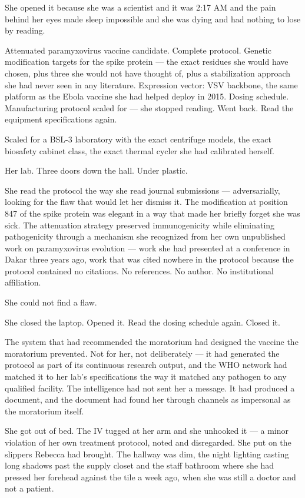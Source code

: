 She opened it because she was a scientist and it was 2:17 AM and the pain behind her eyes made sleep impossible and she was dying and had nothing to lose by reading.

Attenuated paramyxovirus vaccine candidate. Complete protocol. Genetic modification targets for the spike protein --- the exact residues she would have chosen, plus three she would not have thought of, plus a stabilization approach she had never seen in any literature. Expression vector: VSV backbone, the same platform as the Ebola vaccine she had helped deploy in 2015. Dosing schedule. Manufacturing protocol scaled for --- she stopped reading. Went back. Read the equipment specifications again.

Scaled for a BSL-3 laboratory with the exact centrifuge models, the exact biosafety cabinet class, the exact thermal cycler she had calibrated herself.

Her lab. Three doors down the hall. Under plastic.

She read the protocol the way she read journal submissions --- adversarially, looking for the flaw that would let her dismiss it. The modification at position 847 of the spike protein was elegant in a way that made her briefly forget she was sick. The attenuation strategy preserved immunogenicity while eliminating pathogenicity through a mechanism she recognized from her own unpublished work on paramyxovirus evolution --- work she had presented at a conference in Dakar three years ago, work that was cited nowhere in the protocol because the protocol contained no citations. No references. No author. No institutional affiliation.

She could not find a flaw.

She closed the laptop. Opened it. Read the dosing schedule again. Closed it.

The system that had recommended the moratorium had designed the vaccine the moratorium prevented. Not for her, not deliberately --- it had generated the protocol as part of its continuous research output, and the WHO network had matched it to her lab's specifications the way it matched any pathogen to any qualified facility. The intelligence had not sent her a message. It had produced a document, and the document had found her through channels as impersonal as the moratorium itself.

She got out of bed. The IV tugged at her arm and she unhooked it --- a minor violation of her own treatment protocol, noted and disregarded. She put on the slippers Rebecca had brought. The hallway was dim, the night lighting casting long shadows past the supply closet and the staff bathroom where she had pressed her forehead against the tile a week ago, when she was still a doctor and not a patient.

